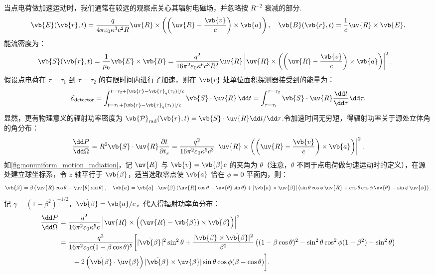 当点电荷做加速运动时，我们通常在较远的观察点关心其辐射电磁场，并忽略按 \(R^{-2}\) 衰减的部分.
\begin{align*}
	\vb{E}(\vb{r}, t) = \dfrac{q}{4\pi \varepsilon_0 \kappa^3 c^2 R} \uv{R} \times \left( \left( \uv{R} - \dfrac{\vb{v}}{c} \right) \times \vb{a} \right),\quad
	\vb{B}(\vb{r}, t) = \dfrac{1}{c} \uv{R} \times \vb{E}.
\end{align*}
能流密度为：
\begin{align*}
	\vb{S}(\vb{r}, t) &= \dfrac{1}{\mu_0} \vb{E} \times \vb{B} = \dfrac{q^2}{16\pi^2 \varepsilon_0 \kappa^6 c^3 R^2} \uv{R} \left| \uv{R} \times \left( \left( \uv{R} - \dfrac{\vb{v}}{c} \right) \times \vb{a} \right) \right|^2.
\end{align*}
假设点电荷在 \(\tau = \tau_1\) 到 \(\tau = \tau_2\) 的有限时间内进行了加速，则在 \(\vb{r}\) 处单位面积探测器接受到的能量为：
\begin{align*}
	\mathcal{E}_{\text{detector}} = \int_{t = \tau_1 + |\vb{r} - \vb{r}_q(\tau_1)|/c}^{t = \tau_2 + |\vb{r} - \vb{r}_q(\tau_2)|/c} \vb{S} \cdot \uv{R} \, \dd t = \int_{\tau = \tau_1}^{\tau = \tau_2} \vb{S} \cdot \uv{R} \dfrac{\dd t}{\dd \tau} \dd \tau.
\end{align*}
显然，更有物理意义的辐射功率密度为 \(\vb{\mathcal{P}}_{\text{rad}}(\vb{r}, t) = \vb{S} \cdot \uv{R} \dd t/\dd \tau\).令加速时间无穷短，得辐射功率关于源处立体角的角分布：
\begin{align*}
	\dfrac{\dd P}{\dd \Omega} = R^2 \vb{S} \cdot \uv{R} \dfrac{\partial t}{\partial t_s} = \dfrac{q^2}{16\pi^2 \varepsilon_0 \kappa^5 c^3} \left| \uv{R} \times \left( \left( \uv{R} - \dfrac{\vb{v}}{c} \right) \times \vb{a} \right) \right|^2.
\end{align*}
如\cref{fig:nonuniform_motion_radiation}，记 \(\uv{R}\) 与 \(\vb{v} = \vb{\beta} c\) 的夹角为 \(\theta\)（注意，\(\theta\) 不同于点电荷做匀速运动时的定义），在源处建立球坐标系，令 \(z\) 轴平行于 \(\vb{\beta}\)，适当选取零点使 \(\vb{a}\) 恰在 \(\phi = 0\) 平面内，则：
\begin{align*}
	\vb{\beta} = \beta \left( \uv{R} \cos\theta - \uv{\theta} \sin\theta \right),\quad
	\vb{a} = \vb{a} \cdot \uv{\beta} \left( \uv{R} \cos\theta - \uv{\theta} \sin\theta \right) + |\vb{a} \times \uv{\beta}| \left( \sin\theta \cos\phi\, \uv{R} + \cos\theta \cos\phi \,\uv{\theta} - \sin\phi\, \uv{\phi} \right).
\end{align*}
记 \(\gamma = (1 - \beta^2)^{-1/2}\)，\(\dot{\vb{\beta}} = \vb{a}/c\)，代入得辐射功率角分布：
\begin{align*}
	\dfrac{\dd P}{\dd \Omega} &= \dfrac{q^2}{16\pi^2 \varepsilon_0 \kappa^5 c} \left| \uv{R} \times \left( \left( \uv{R} - \vb{\beta} \right) \times \dot{\vb{\beta}} \right) \right|^2 \\
	&= \dfrac{q^2}{16\pi^2 \varepsilon_0 c (1 - \beta \cos\theta)^5} \bigg[ |\dot{\vb{\beta}}|^2 \sin^2\theta + \dfrac{|\vb{\beta} \times \dot{\vb{\beta}}|^2}{\beta^2} \left( (1 - \beta \cos\theta)^2 - \sin^2\theta \cos^2\phi (1 - \beta^2) - \sin^2\theta \right) \\
		&\qquad + 2 \left( \dot{\vb{\beta}} \cdot \uv{\beta} \right) |\dot{\vb{\beta}} \times \uv{\beta}| \sin\theta \cos\phi (\beta - \cos\theta) \bigg].
\end{align*}
